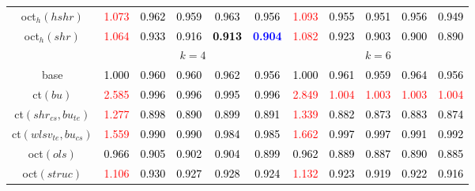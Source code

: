 \begin{tabular}[t]{c|>{}cccc>{}c|ccccc}
oct$_h(hshr)$ & \textcolor{red}{1.073} & \textcolor{black}{0.962} & \textcolor{black}{0.959} & \textcolor{black}{0.963} & \textcolor{black}{0.956} & \textcolor{red}{1.093} & \textcolor{black}{0.955} & \textcolor{black}{0.951} & \textcolor{black}{0.956} & \textcolor{black}{0.949}\\
oct$_h(shr)$ & \textcolor{red}{1.064} & \textcolor{black}{0.933} & \textcolor{black}{0.916} & \textcolor{black}{\textbf{0.913}} & \textcolor{blue}{\textbf{0.904}} & \textcolor{red}{1.082} & \textcolor{black}{0.923} & \textcolor{black}{0.903} & \textcolor{black}{0.900} & \textcolor{black}{0.890}\\
\addlinespace[0.3em]
\multicolumn{1}{c}{} & \multicolumn{5}{c}{\textbf{$k = 4$}} & \multicolumn{5}{c}{\textbf{$k = 6$}}\\
base & \textcolor{black}{1.000} & \textcolor{black}{0.960} & \textcolor{black}{0.960} & \textcolor{black}{0.962} & \textcolor{black}{0.956} & \textcolor{black}{1.000} & \textcolor{black}{0.961} & \textcolor{black}{0.959} & \textcolor{black}{0.964} & \textcolor{black}{0.956}\\
ct$(bu)$ & \textcolor{red}{2.585} & \textcolor{black}{0.996} & \textcolor{black}{0.996} & \textcolor{black}{0.995} & \textcolor{black}{0.996} & \textcolor{red}{2.849} & \textcolor{red}{1.004} & \textcolor{red}{1.003} & \textcolor{red}{1.003} & \textcolor{red}{1.004}\\
ct$(shr_{cs}, bu_{te})$ & \textcolor{red}{1.277} & \textcolor{black}{0.898} & \textcolor{black}{0.890} & \textcolor{black}{0.899} & \textcolor{black}{0.891} & \textcolor{red}{1.339} & \textcolor{black}{0.882} & \textcolor{black}{0.873} & \textcolor{black}{0.883} & \textcolor{black}{0.874}\\
ct$(wlsv_{te}, bu_{cs})$ & \textcolor{red}{1.559} & \textcolor{black}{0.990} & \textcolor{black}{0.990} & \textcolor{black}{0.984} & \textcolor{black}{0.985} & \textcolor{red}{1.662} & \textcolor{black}{0.997} & \textcolor{black}{0.997} & \textcolor{black}{0.991} & \textcolor{black}{0.992}\\
oct$(ols)$ & \textcolor{black}{0.966} & \textcolor{black}{0.905} & \textcolor{black}{0.902} & \textcolor{black}{0.904} & \textcolor{black}{0.899} & \textcolor{black}{0.962} & \textcolor{black}{0.889} & \textcolor{black}{0.887} & \textcolor{black}{0.890} & \textcolor{black}{0.885}\\
oct$(struc)$ & \textcolor{red}{1.106} & \textcolor{black}{0.930} & \textcolor{black}{0.927} & \textcolor{black}{0.928} & \textcolor{black}{0.924} & \textcolor{red}{1.132} & \textcolor{black}{0.923} & \textcolor{black}{0.919} & \textcolor{black}{0.922} & \textcolor{black}{0.916}\\

\end{tabular}
